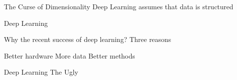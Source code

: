 %
%
%

\begin{slide}{The Curse of Dimensionality}
  {\Large
    Deep Learning assumes that data is structured\\

  }
\end{slide}




\begin{slide}{Deep Learning}
  \begin{itemize}
    \pitem Why the recent success of deep learning? %
    \pitem Three reasons
    \begin{enumerate}
      \pitem Better hardware
      \pitem More data
      \pitem Better methods
    \end{enumerate}
  \end{itemize}
\end{slide}

\begin{slide}{Deep Learning}
  {
    \Huge
    The Ugly
  }
\end{slide}

